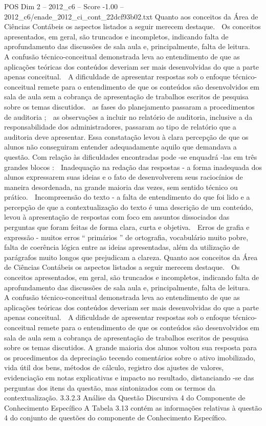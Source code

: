 \begin{textsample}{POS Dim 2 – 2012\_c6 – Score -1.00 – 2012\_c6/enade\_2012\_ci\_cont\_22dcf93b02.txt}
Quanto aos conceitos da Área de Ciências Contábeis os aspectos listados a seguir merecem destaque.  Os conceitos apresentados, em geral, são truncados e incompletos, indicando falta de aprofundamento das discussões de sala aula e, principalmente, falta de leitura.  A confusão técnico-conceitual demonstrada leva ao entendimento de que as aplicações teóricas dos conteúdos deveriam ser mais desenvolvidas do que a parte apenas conceitual.  A dificuldade de apresentar respostas sob o enfoque técnico-conceitual remete para o entendimento de que os conteúdos são desenvolvidos em sala de aula sem a cobrança de apresentação de trabalhos escritos de pesquisa sobre os temas discutidos.  as fases do planejamento passaram a procedimentos de auditoria ;  as observações a incluir no relatório de auditoria, inclusive a da responsabilidade dos administradores, passaram ao tipo de relatório que a auditoria deve apresentar.
Essa constatação levou à clara percepção de que os alunos não conseguiram entender adequadamente aquilo que demandava a questão.
Com relação às dificuldades encontradas pode -se enquadrá -las em três grandes blocos :  Inadequação na redação das respostas - a forma inadequada dos alunos expressarem suas ideias e o fato de desenvolverem seus raciocínios de maneira desordenada, na grande maioria das vezes, sem sentido técnico ou prático.  Incompreensão do texto - a falta de entendimento do que foi lido e a percepção de que a contextualização do texto é uma descrição de um conteúdo, levou à apresentação de respostas com foco em assuntos dissociados das perguntas que foram feitas de forma clara, curta e objetiva.  Erros de grafia e expressão - muitos erros “ primários ” de ortografia, vocabulário muito pobre, falta de coerência lógica entre as ideias apresentadas, além da utilização de parágrafos muito longos que prejudicam a clareza.
Quanto aos conceitos da Área de Ciências Contábeis os aspectos listados a seguir merecem destaque.  Os conceitos apresentados, em geral, são truncados e incompletos, indicando falta de aprofundamento das discussões de sala aula e, principalmente, falta de leitura.  A confusão técnico-conceitual demonstrada leva ao entendimento de que as aplicações teóricas dos conteúdos deveriam ser mais desenvolvidas do que a parte apenas conceitual.  A dificuldade de apresentar respostas sob o enfoque técnico-conceitual remete para o entendimento de que os conteúdos são desenvolvidos em sala de aula sem a cobrança de apresentação de trabalhos escritos de pesquisa sobre os temas discutidos.
A grande maioria dos alunos voltou sua resposta para os procedimentos da depreciação tecendo comentários sobre o ativo imobilizado, vida útil dos bens, métodos de cálculo, registro dos ajustes de valores, evidenciação em notas explicativas e impacto no resultado, distanciando -se das perguntas dos itens da questão, mas sintonizados com os termos da contextualização. 3.3.2.3 Análise da Questão Discursiva 4 do Componente de Conhecimento Específico A Tabela 3.13 contém as informações relativas à questão 4 do conjunto de questões do componente de Conhecimento Específico.

\end{textsample}
